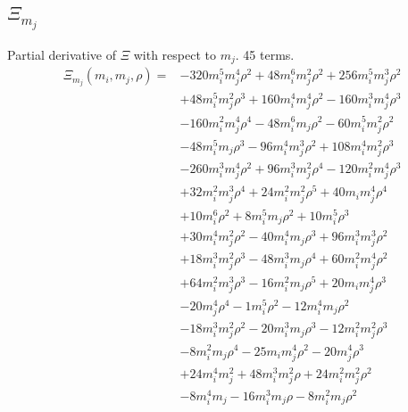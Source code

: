 \subsection*{$\Xi_{m_j}$}
Partial derivative of $\Xi$ with respect to $m_j$. 45 terms.
{\small
\begin{align*}
\Xi_{m_j}(m_i,m_j,\rho)={}&-320m_i^{5}m_j^{4}\rho^{2}+48m_i^{6}m_j^{2}\rho^{2}+256m_i^{5}m_j^{3}\rho^{2}\\
&+48m_i^{5}m_j^{2}\rho^{3}+160m_i^{4}m_j^{4}\rho^{2}-160m_i^{3}m_j^{4}\rho^{3}\\
&-160m_i^{2}m_j^{4}\rho^{4}-48m_i^{6}m_j\rho^{2}-60m_i^{5}m_j^{2}\rho^{2}\\
&-48m_i^{5}m_j\rho^{3}-96m_i^{4}m_j^{3}\rho^{2}+108m_i^{4}m_j^{2}\rho^{3}\\
&-260m_i^{3}m_j^{4}\rho^{2}+96m_i^{3}m_j^{2}\rho^{4}-120m_i^{2}m_j^{4}\rho^{3}\\
&+32m_i^{2}m_j^{3}\rho^{4}+24m_i^{2}m_j^{2}\rho^{5}+40m_im_j^{4}\rho^{4}\\
&+10m_i^{6}\rho^{2}+8m_i^{5}m_j\rho^{2}+10m_i^{5}\rho^{3}\\
&+30m_i^{4}m_j^{2}\rho^{2}-40m_i^{4}m_j\rho^{3}+96m_i^{3}m_j^{3}\rho^{2}\\
&+18m_i^{3}m_j^{2}\rho^{3}-48m_i^{3}m_j\rho^{4}+60m_i^{2}m_j^{4}\rho^{2}\\
&+64m_i^{2}m_j^{3}\rho^{3}-16m_i^{2}m_j\rho^{5}+20m_im_j^{4}\rho^{3}\\
&-20m_j^{4}\rho^{4}-1m_i^{5}\rho^{2}-12m_i^{4}m_j\rho^{2}\\
&-18m_i^{3}m_j^{2}\rho^{2}-20m_i^{3}m_j\rho^{3}-12m_i^{2}m_j^{2}\rho^{3}\\
&-8m_i^{2}m_j\rho^{4}-25m_im_j^{4}\rho^{2}-20m_j^{4}\rho^{3}\\
&+24m_i^{4}m_j^{2}+48m_i^{3}m_j^{2}\rho+24m_i^{2}m_j^{2}\rho^{2}\\
&-8m_i^{4}m_j-16m_i^{3}m_j\rho-8m_i^{2}m_j\rho^{2}
\end{align*}
}

